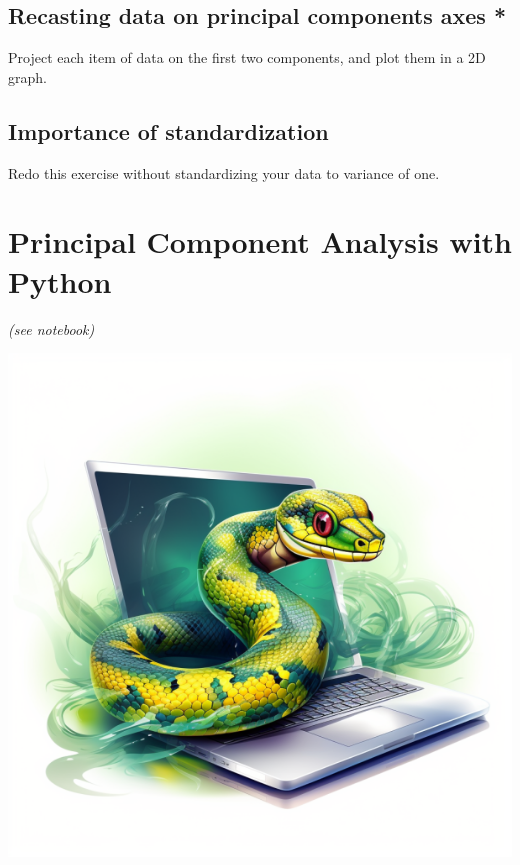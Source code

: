 \documentclass[]{article}
\begin{document}
	\subsection{Recasting data on principal components axes *}
	Project each item of data on the first two components, and plot them in a 2D graph.
	
	\subsection{Importance of standardization}
	Redo this exercise without standardizing your data to variance of one.
	
	\section{Principal Component Analysis with Python}
	\textit{(see notebook)}
	
	\begin{center}
		\vspace{0.2cm}
		\includegraphics[width=0.5\linewidth]{python}
		\vspace{0.2cm}
	\end{center}
\end{document}
